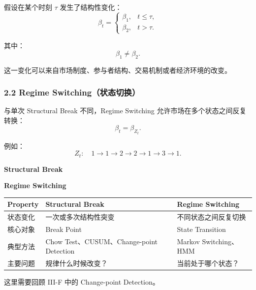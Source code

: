 假设在某个时刻 \(\tau\) 发生了结构性变化：
\[\boxed{
\beta_t=
\begin{cases}
\beta_1,&t\leq\tau,\\
\beta_2,&t>\tau.
\end{cases}
}\]

其中：
\[\beta_1\neq\beta_2.\]

这一变化可以来自市场制度、参与者结构、交易机制或者经济环境的改变。

\hypertarget{part-4-77-0001-regime-switchingux72b6ux6001ux5207ux6362}{%
\subsubsection{2.2 Regime Switching（状态切换）}\label{part-4-77-0001-regime-switchingux72b6ux6001ux5207ux6362}}

与单次 Structural Break 不同，Regime Switching 允许市场在多个状态之间反复转换：
\[\boxed{
\beta_t=\beta_{Z_t}.
}\]

例如：
\[Z_t:
\quad
1\rightarrow1\rightarrow2\rightarrow2
\rightarrow1\rightarrow3\rightarrow1.\]

\textbf{Structural Break}


\textbf{Regime Switching}


\begin{readertable}
\begin{longtable}[]{@{}
  >{\raggedright\arraybackslash}p{}
  >{\raggedright\arraybackslash}p{}
  >{\raggedright\arraybackslash}p{}@{}}
\toprule
Property & Structural Break & Regime Switching \\
\midrule
\endhead
状态变化 & 一次或多次结构性突变 & 不同状态之间反复切换 \\
核心对象 & Break Point & State Transition \\
典型方法 & Chow Test、CUSUM、Change-point Detection & Markov Switching、HMM \\
主要问题 & 规律什么时候改变？ & 当前处于哪个状态？ \\
\bottomrule
\end{longtable}
\end{readertable}

这里需要回顾 III-F 中的 Change-point Detection。

